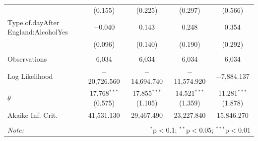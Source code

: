 \documentclass[12pt, letterpaper]{article}
\begin{document}
\begin{table}
{\begin{tabular}{@{\extracolsep{5pt}}lcccc}
  & (0.155) & (0.225) & (0.297) & (0.566) \\ 
  Type.of.dayAfter England:AlcoholYes & $-$0.040 & 0.143 & 0.248 & 0.354 \\ 
  & (0.096) & (0.140) & (0.190) & (0.292) \\ 
 \hline \\[-1.8ex] 
Observations & 6,034 & 6,034 & 6,034 & 6,034 \\ 
Log Likelihood & $-$20,726.560 & $-$14,694.740 & $-$11,574.920 & $-$7,884.137 \\ 
$\theta$ & 17.768$^{***}$  (0.575) & 17.855$^{***}$  (1.105) & 14.521$^{***}$  (1.359) & 11.281$^{***}$  (1.878) \\ 
Akaike Inf. Crit. & 41,531.130 & 29,467.490 & 23,227.840 & 15,846.270 \\ 
\hline 
\hline \\[-1.8ex] 
\textit{Note:}  & \multicolumn{4}{r}{$^{*}$p$<$0.1; $^{**}$p$<$0.05; $^{***}$p$<$0.01} \\ 
\end{tabular}
 
  }
\end{table}

\clearpage
\printbibliography
\end{document}
